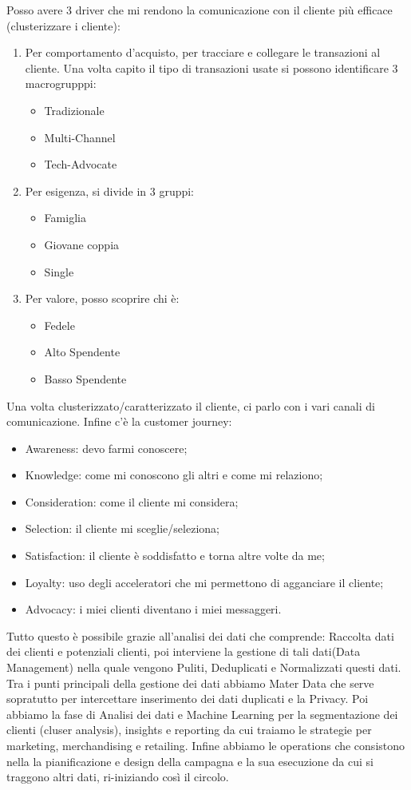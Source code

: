 \documentclass[11pt]{article}
\begin{document}
Posso avere 3 driver che mi rendono la comunicazione con il cliente più efficace (clusterizzare i cliente):
\begin{enumerate}[noitemsep,topsep=0ex]
	\item Per comportamento d'acquisto, per tracciare e collegare le transazioni al cliente. Una volta capito il tipo di transazioni usate si possono identificare 3 macrogrupppi:
	\begin{itemize}[noitemsep,topsep=0ex]
		\item Tradizionale
		\item Multi-Channel
		\item Tech-Advocate
	\end{itemize}
	\item Per esigenza, si divide in 3 gruppi:
	\begin{itemize}[noitemsep,topsep=0ex]
		\item Famiglia 
		\item Giovane coppia
		\item Single
	\end{itemize}
	\item Per valore, posso scoprire chi è:
	\begin{itemize}[noitemsep,topsep=0ex]
		\item Fedele
		\item Alto Spendente 
		\item Basso Spendente
	\end{itemize}
\end{enumerate}
Una volta clusterizzato/caratterizzato il cliente, ci parlo con i vari canali di comunicazione. Infine c'è la customer journey: 
\begin{itemize}[noitemsep,topsep=0ex]
	\item Awareness: devo farmi conoscere;
	\item Knowledge: come mi conoscono gli altri e come mi relaziono; 
	\item Consideration: come il cliente mi considera; 
	\item Selection: il cliente mi sceglie/seleziona;
	\item Satisfaction: il cliente è soddisfatto e torna altre volte da me; 
	\item Loyalty: uso degli acceleratori che mi permettono di agganciare il cliente;
	\item Advocacy: i miei clienti diventano i miei messaggeri.
\end{itemize}

Tutto questo è possibile grazie all'analisi dei dati che comprende: Raccolta dati dei clienti e potenziali clienti, poi interviene la gestione di tali dati(Data Management) nella quale vengono Puliti, Deduplicati e Normalizzati questi dati. Tra i punti principali della gestione dei dati abbiamo Mater Data che serve sopratutto per intercettare inserimento dei dati duplicati e la Privacy. 
Poi abbiamo la fase di Analisi dei dati e Machine Learning per la segmentazione dei clienti (cluser analysis), insights e reporting da cui traiamo le strategie per marketing, merchandising e retailing. 
Infine abbiamo le operations che consistono nella la pianificazione e design della campagna e la sua esecuzione da cui si traggono altri dati, ri-iniziando così il circolo.
\end{document}
